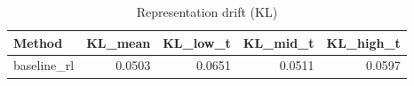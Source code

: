 \begin{table}[htbp]
\centering
\caption{Representation drift (KL)}
\label{tab:repr-drift}
\begin{tabular}{lrrrr}
\toprule
\textbf{Method} & \textbf{KL\_mean} & \textbf{KL\_low\_t} & \textbf{KL\_mid\_t} & \textbf{KL\_high\_t} \\
\midrule
baseline\_rl & 0.0503 & 0.0651 & 0.0511 & 0.0597 \\
\bottomrule
\end{tabular}
\end{table}